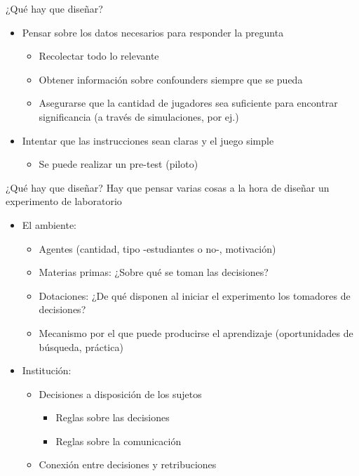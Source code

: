 \documentclass[
  ignorenonframetext,
]{beamer}
\providecommand{\tightlist}{%
  \setlength{\itemsep}{0pt}\setlength{\parskip}{0pt}}
\begin{document}
\begin{frame}{¿Qué hay que diseñar?}
\protect\hypertarget{quuxe9-hay-que-diseuxf1ar}{}
\begin{itemize}
\tightlist
\item
  Pensar sobre los datos necesarios para responder la pregunta

  \begin{itemize}
  \tightlist
  \item
    Recolectar todo lo relevante
  \item
    Obtener información sobre confounders siempre que se pueda
  \item
    Asegurarse que la cantidad de jugadores sea suficiente para
    encontrar significancia (a través de simulaciones, por ej.)
  \end{itemize}
\item
  Intentar que las instrucciones sean claras y el juego simple

  \begin{itemize}
  \tightlist
  \item
    Se puede realizar un pre-test (piloto)
  \end{itemize}
\end{itemize}
\end{frame}

\begin{frame}{¿Qué hay que diseñar?}
\protect\hypertarget{quuxe9-hay-que-diseuxf1ar-1}{}
Hay que pensar varias cosas a la hora de diseñar un experimento de
laboratorio

\begin{itemize}
\tightlist
\item
  El ambiente:

  \begin{itemize}
  \tightlist
  \item
    Agentes (cantidad, tipo -estudiantes o no-, motivación)
  \item
    Materias primas: ¿Sobre qué se toman las decisiones?
  \item
    Dotaciones: ¿De qué disponen al iniciar el experimento los tomadores
    de decisiones?
  \item
    Mecanismo por el que puede producirse el aprendizaje (oportunidades
    de búsqueda, práctica)
  \end{itemize}
\item
  Institución:

  \begin{itemize}
  \tightlist
  \item
    Decisiones a disposición de los sujetos

    \begin{itemize}
    \tightlist
    \item
      Reglas sobre las decisiones
    \item
      Reglas sobre la comunicación
    \end{itemize}
  \item
    Conexión entre decisiones y retribuciones
  \end{itemize}
\end{itemize}
\end{frame}
\end{document}
